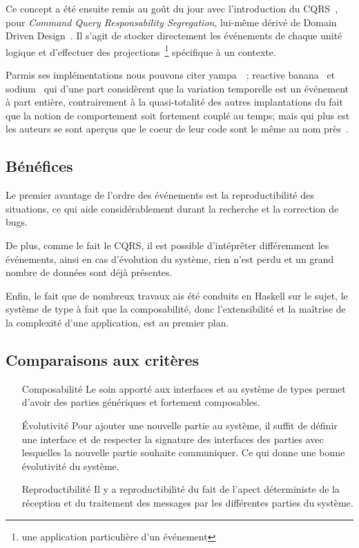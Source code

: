 \documentclass{article}
\begin{document}
Ce concept a été ensuite remis au goût du jour avec l'introduction du CQRS~\cite{cqrs},
pour \emph{Command Query Responsability Segregation}, lui-même dérivé de
Domain Driven Design~\cite{ddd}.
Il s'agit de stocker directement les événements de chaque unité logique et d'effectuer
des projections~\footnote{une application particulière d'un événement} spécifique à un contexte.

Parmis ses implémentations nous pouvons citer yampa~\cite{yampa}~\cite{arrows};
reactive banana~\cite{reactivebanana} et sodium~\cite{sodium} qui d'une part considèrent que
la variation temporelle est un événement à part entière, contrairement à
la quasi-totalité des autres implantations du fait que la notion de
comportement soit fortement couplé au temps; mais qui plus est les
auteurs se sont aperçus que le coeur de leur code sont le même au nom
près~\cite{sodium_talk}.

\subsection{Bénéfices}\label{bénéfices-1}

Le premier avantage de l'ordre des événements est la reproductibilité
des situations, ce qui aide considérablement durant la recherche et la
correction de bugs.

De plus, comme le fait le CQRS, il est possible d'intéprêter différemment
les événements, ainsi en cas d'évolution du système, rien n'est perdu et
un grand nombre de données sont déjà présentes.

Enfin, le fait que de nombreux travaux ais été conduits en Haskell sur
le sujet, le système de type à fait que la composabilité, donc
l'extensibilité et la maîtrise de la complexité d'une application, est
au premier plan.

\subsection{Comparaisons aux critères}
\begin{itemize}
    \item[Composabilité] Le soin apporté aux interfaces et au système de types
permet d'avoir des parties génériques et fortement composables.
    \item[Évolutivité] Pour ajouter une nouvelle partie au système, il suffit de
définir une interface et de respecter la signature des interfaces des parties
avec lesquelles la nouvelle partie souhaite communiquer. Ce qui donne une bonne
évolutivité du système.
    \item[Reproductibilité] Il y a reproductibilité du fait de l'apect déterministe
de la réception et du traitement des messages par les différentes parties du système.
\end{itemize}
\end{document}
